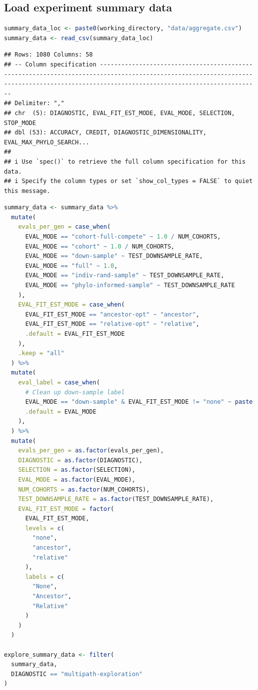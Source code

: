 \documentclass[
]{book}
\begin{document}
\hypertarget{load-experiment-summary-data-2}{%
\subsection{Load experiment summary data}\label{load-experiment-summary-data-2}}

\begin{lstlisting}[language=R]
summary_data_loc <- paste0(working_directory, "data/aggregate.csv")
summary_data <- read_csv(summary_data_loc)
\end{lstlisting}

\begin{lstlisting}
## Rows: 1080 Columns: 58
## -- Column specification -----------------------------------------------------------------------------------------------------------------------------------------------------------------------------------------
## Delimiter: ","
## chr  (5): DIAGNOSTIC, EVAL_FIT_EST_MODE, EVAL_MODE, SELECTION, STOP_MODE
## dbl (53): ACCURACY, CREDIT, DIAGNOSTIC_DIMENSIONALITY, EVAL_MAX_PHYLO_SEARCH...
## 
## i Use `spec()` to retrieve the full column specification for this data.
## i Specify the column types or set `show_col_types = FALSE` to quiet this message.
\end{lstlisting}

\begin{lstlisting}[language=R]
summary_data <- summary_data %>%
  mutate(
    evals_per_gen = case_when(
      EVAL_MODE == "cohort-full-compete" ~ 1.0 / NUM_COHORTS,
      EVAL_MODE == "cohort" ~ 1.0 / NUM_COHORTS,
      EVAL_MODE == "down-sample" ~ TEST_DOWNSAMPLE_RATE,
      EVAL_MODE == "full" ~ 1.0,
      EVAL_MODE == "indiv-rand-sample" ~ TEST_DOWNSAMPLE_RATE,
      EVAL_MODE == "phylo-informed-sample" ~ TEST_DOWNSAMPLE_RATE
    ),
    EVAL_FIT_EST_MODE = case_when(
      EVAL_FIT_EST_MODE == "ancestor-opt" ~ "ancestor",
      EVAL_FIT_EST_MODE == "relative-opt" ~ "relative",
      .default = EVAL_FIT_EST_MODE
    ),
    .keep = "all"
  ) %>%
  mutate(
    eval_label = case_when(
      # Clean up down-sample label
      EVAL_MODE == "down-sample" & EVAL_FIT_EST_MODE != "none" ~ paste("down-sample", EVAL_FIT_EST_MODE, sep="-"),
      .default = EVAL_MODE
    ),
  ) %>%
  mutate(
    evals_per_gen = as.factor(evals_per_gen),
    DIAGNOSTIC = as.factor(DIAGNOSTIC),
    SELECTION = as.factor(SELECTION),
    EVAL_MODE = as.factor(EVAL_MODE),
    NUM_COHORTS = as.factor(NUM_COHORTS),
    TEST_DOWNSAMPLE_RATE = as.factor(TEST_DOWNSAMPLE_RATE),
    EVAL_FIT_EST_MODE = factor(
      EVAL_FIT_EST_MODE,
      levels = c(
        "none",
        "ancestor",
        "relative"
      ),
      labels = c(
        "None",
        "Ancestor",
        "Relative"
      )
    )
  )

explore_summary_data <- filter(
  summary_data,
  DIAGNOSTIC == "multipath-exploration"
)
\end{lstlisting}
\end{document}
